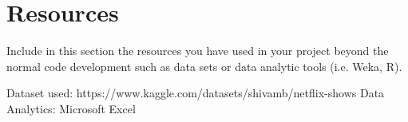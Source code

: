 \documentclass[12pt]{article}
\begin{document}


\section{Resources}
Include in this section the resources you have used in your project beyond the normal code development such as data sets or data analytic tools (i.e. Weka, R).

Dataset used:
https://www.kaggle.com/datasets/shivamb/netflix-shows
Data Analytics:
Microsoft Excel
\end{document}
